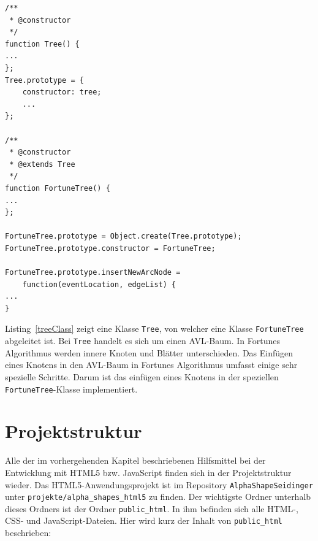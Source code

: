 \begin{lstlisting}[float = htbp, caption={Eine AVL-Baum-Klasse},label=treeClass]
/**
 * @constructor
 */
function Tree() {
...
};
Tree.prototype = {
	constructor: tree;
	...
};

/**
 * @constructor
 * @extends Tree
 */
function FortuneTree() {
...
};

FortuneTree.prototype = Object.create(Tree.prototype);
FortuneTree.prototype.constructor = FortuneTree;

FortuneTree.prototype.insertNewArcNode =
	function(eventLocation, edgeList) {
...
}
\end{lstlisting}

Listing~\ref{treeClass} zeigt eine Klasse \verb+Tree+, von welcher eine Klasse \verb+FortuneTree+ abgeleitet ist. Bei \verb+Tree+ handelt es sich um einen AVL-Baum. In Fortunes Algorithmus werden innere Knoten und Blätter unterschieden. Das Einfügen eines Knotens in den AVL-Baum in Fortunes Algorithmus umfasst einige sehr spezielle Schritte. Darum ist das einfügen eines Knotens in der speziellen \verb+FortuneTree+-Klasse implementiert.

\chapter{Projektstruktur}

Alle der im vorhergehenden Kapitel beschriebenen Hilfsmittel bei der Entwicklung mit HTML5 bzw. JavaScript finden sich in der Projektstruktur wieder. Das HTML5-Anwendungsprojekt ist im Repository \verb+AlphaShapeSeidinger+ unter \verb+projekte/alpha_shapes_html5+ zu finden. Der wichtigste Ordner unterhalb dieses Ordners ist der Ordner \verb+public_html+. In ihm befinden sich alle HTML-, CSS- und JavaScript-Dateien. Hier wird kurz der Inhalt von \verb+public_html+ beschrieben:

